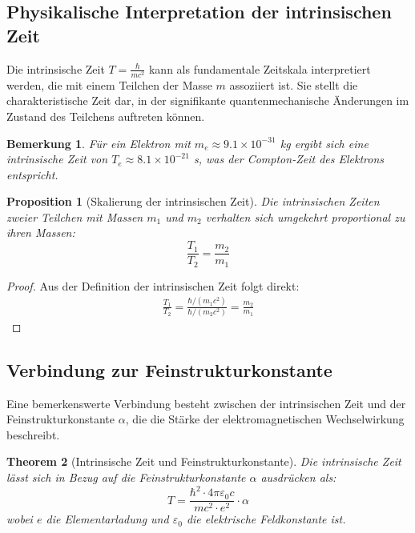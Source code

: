 \documentclass[a4paper,12pt]{article}
\newtheorem{theorem}{Theorem}[section]
\newtheorem{proposition}[theorem]{Proposition}
\newtheorem{remark}{Bemerkung}[section]
\begin{document}
	\subsection{Physikalische Interpretation der intrinsischen Zeit}
	
	Die intrinsische Zeit \( T = \frac{\hbar}{mc^2} \) kann als fundamentale Zeitskala interpretiert werden, die mit einem Teilchen der Masse \( m \) assoziiert ist. Sie stellt die charakteristische Zeit dar, in der signifikante quantenmechanische Änderungen im Zustand des Teilchens auftreten können.
	
	\begin{remark}
		Für ein Elektron mit \( m_e \approx 9.1 \times 10^{-31} \) kg ergibt sich eine intrinsische Zeit von \( T_e \approx 8.1 \times 10^{-21} \) s, was der Compton-Zeit des Elektrons entspricht.
	\end{remark}
	
	\begin{proposition}[Skalierung der intrinsischen Zeit]
		Die intrinsischen Zeiten zweier Teilchen mit Massen \( m_1 \) und \( m_2 \) verhalten sich umgekehrt proportional zu ihren Massen:
		\begin{equation}
			\frac{T_1}{T_2} = \frac{m_2}{m_1}
		\end{equation}
	\end{proposition}
	
	\begin{proof}
		Aus der Definition der intrinsischen Zeit folgt direkt:
		\begin{align}
			\frac{T_1}{T_2} = \frac{\hbar/(m_1 c^2)}{\hbar/(m_2 c^2)} = \frac{m_2}{m_1}
		\end{align}
	\end{proof}
	
	\subsection{Verbindung zur Feinstrukturkonstante}
	
	Eine bemerkenswerte Verbindung besteht zwischen der intrinsischen Zeit und der Feinstrukturkonstante \( \alpha \), die die Stärke der elektromagnetischen Wechselwirkung beschreibt.
	
	\begin{theorem}[Intrinsische Zeit und Feinstrukturkonstante]
		Die intrinsische Zeit lässt sich in Bezug auf die Feinstrukturkonstante \( \alpha \) ausdrücken als:
		\begin{equation}
			T = \frac{\hbar^2 \cdot 4\pi \varepsilon_0 c}{m c^2 \cdot e^2} \cdot \alpha
		\end{equation}
		wobei \( e \) die Elementarladung und \( \varepsilon_0 \) die elektrische Feldkonstante ist.
	\end{theorem}
	
\end{document}
